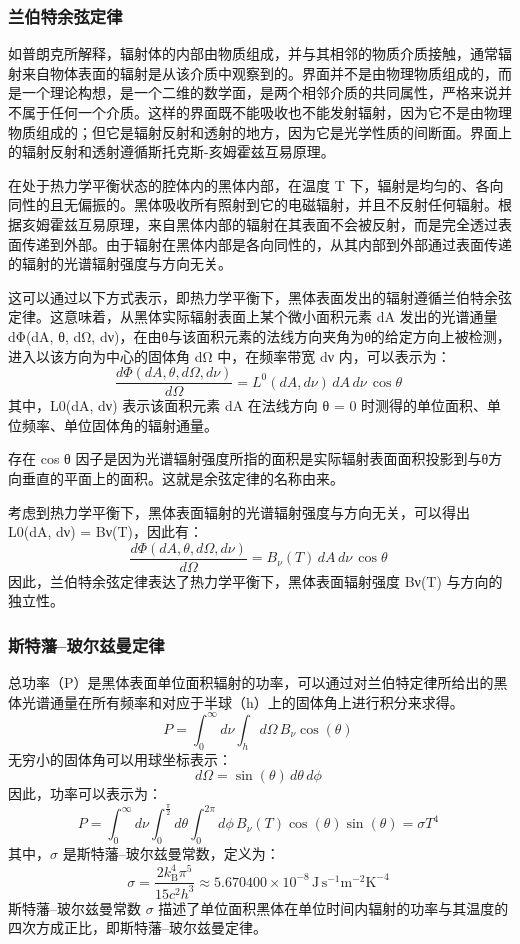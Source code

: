 \subsubsection{兰伯特余弦定律}
如普朗克所解释，辐射体的内部由物质组成，并与其相邻的物质介质接触，通常辐射来自物体表面的辐射是从该介质中观察到的。界面并不是由物理物质组成的，而是一个理论构想，是一个二维的数学面，是两个相邻介质的共同属性，严格来说并不属于任何一个介质。这样的界面既不能吸收也不能发射辐射，因为它不是由物理物质组成的；但它是辐射反射和透射的地方，因为它是光学性质的间断面。界面上的辐射反射和透射遵循斯托克斯-亥姆霍兹互易原理。

在处于热力学平衡状态的腔体内的黑体内部，在温度 T 下，辐射是均匀的、各向同性的且无偏振的。黑体吸收所有照射到它的电磁辐射，并且不反射任何辐射。根据亥姆霍兹互易原理，来自黑体内部的辐射在其表面不会被反射，而是完全透过表面传递到外部。由于辐射在黑体内部是各向同性的，从其内部到外部通过表面传递的辐射的光谱辐射强度与方向无关。

这可以通过以下方式表示，即热力学平衡下，黑体表面发出的辐射遵循兰伯特余弦定律。这意味着，从黑体实际辐射表面上某个微小面积元素 dA 发出的光谱通量 dΦ(dA, θ, dΩ, dν)，在由θ与该面积元素的法线方向夹角为θ的给定方向上被检测，进入以该方向为中心的固体角 dΩ 中，在频率带宽 dν 内，可以表示为：
\[
\frac{d\Phi (dA,\theta ,d\Omega ,d\nu )}{d\Omega } = L^{0}(dA,d\nu )\,dA\,d\nu \,\cos \theta~
\]
其中，L0(dA, dν) 表示该面积元素 dA 在法线方向 θ = 0 时测得的单位面积、单位频率、单位固体角的辐射通量。

存在 cos θ 因子是因为光谱辐射强度所指的面积是实际辐射表面面积投影到与θ方向垂直的平面上的面积。这就是余弦定律的名称由来。

考虑到热力学平衡下，黑体表面辐射的光谱辐射强度与方向无关，可以得出 L0(dA, dν) = Bν(T)，因此有：
\[
\frac{d\Phi (dA,\theta ,d\Omega ,d\nu )}{d\Omega } = B_{\nu }(T)\,dA\,d\nu \,\cos \theta~
\]
因此，兰伯特余弦定律表达了热力学平衡下，黑体表面辐射强度 Bν(T) 与方向的独立性。
\subsubsection{斯特藩–玻尔兹曼定律}
总功率（P）是黑体表面单位面积辐射的功率，可以通过对兰伯特定律所给出的黑体光谱通量在所有频率和对应于半球（h）上的固体角上进行积分来求得。
\[
P = \int_0^\infty d\nu \int_h d\Omega \, B_{\nu} \cos(\theta)~
\]
无穷小的固体角可以用球坐标表示：
\[
d\Omega = \sin(\theta) \, d\theta \, d\phi~
\]
因此，功率可以表示为：
\[
P = \int_0^\infty d\nu \int_0^{\frac{\pi}{2}} d\theta \int_0^{2\pi} d\phi \, B_{\nu}(T) \cos(\theta) \sin(\theta) = \sigma T^4~
\]
其中，\(\sigma\) 是斯特藩–玻尔兹曼常数，定义为：
\[
\sigma = \frac{2 k_{\mathrm{B}}^4 \pi^5}{15 c^2 h^3} \approx 5.670400 \times 10^{-8} \, \mathrm{J\,s^{-1}m^{-2}K^{-4}}~
\]
斯特藩–玻尔兹曼常数 \(\sigma\) 描述了单位面积黑体在单位时间内辐射的功率与其温度的四次方成正比，即斯特藩–玻尔兹曼定律。
